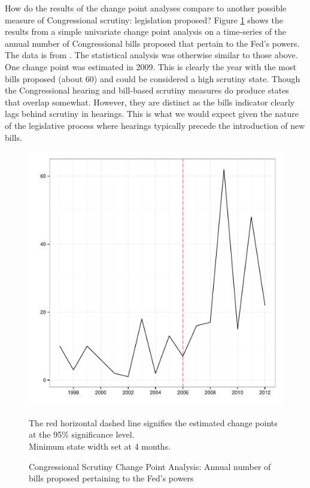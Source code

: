 \documentclass[a4paper]{article}\usepackage[]{graphicx}\usepackage[]{color}
\makeatletter
\newenvironment{kframe}{%
 \def\at@end@of@kframe{}%
 \ifinner\ifhmode%
  \def\at@end@of@kframe{\end{minipage}}%
  \begin{minipage}{\columnwidth}%
 \fi\fi%
 \def\FrameCommand##1{\hskip\@totalleftmargin \hskip-\fboxsep
 \colorbox{shadecolor}{##1}\hskip-\fboxsep
     \hskip-\linewidth \hskip-\@totalleftmargin \hskip\columnwidth}%
 \MakeFramed {\advance\hsize-\width
   \@totalleftmargin\z@ \linewidth\hsize
   \@setminipage}}%
 {\par\unskip\endMakeFramed%
 \at@end@of@kframe}
\newenvironment{knitrout}{}{} %
\makeatother
\begin{document}
How do the results of the change point analyses compare to another possible measure of Congressional scrutiny: legislation proposed? Figure \ref{fig:BillsCompare} shows the results from a simple univariate change point analysis on a time-series of the annual number of Congressional bills proposed that pertain to the Fed's powers. The data is from \cite{Binder2014}. The statistical analysis was otherwise similar to those above. One change point was estimated in 2009. This is clearly the year with the most bills proposed (about 60) and could be considered a high scrutiny state. Though the Congressional hearing and bill-based scrutiny measures do produce states that overlap somewhat. However, they are distinct as the bills indicator clearly lags behind scrutiny in hearings. This is what we would expect given the nature of the legislative process where hearings typically precede the introduction of new bills.

\begin{figure}
    \caption{Congressional Scrutiny Change Point Analysis: Annual number of bills proposed pertaining to the Fed's powers}
    \label{fig:BillsCompare}
\begin{knitrout}
\color{fgcolor}\begin{kframe}


{\ttfamily\noindent\bfseries{}}\end{kframe}

{\centering \includegraphics[width=0.8\linewidth]{figure/ScrutinyBills} 

}



\end{knitrout}
{\scriptsize{The red horizontal dashed line signifies the estimated change points at the 95\% significance level.\\
Minimum state width set at 4 months.}}
\end{figure}
\end{document}
